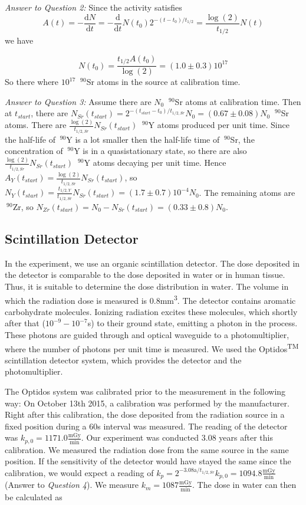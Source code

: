 \documentclass[a4paper,parskip]{scrartcl}
\begin{document}
\textit{Answer to Question 2:} Since the activity satisfies 
$$A(t) = -\frac{\mathrm{d}N}{\mathrm{d}t} = -\frac{\mathrm{d}}{\mathrm{d}t}N(t_0)2^{-(t-t_{0})/t_{1/2}} = \frac{\log(2)}{t_{1/2}}N(t)$$
we have

$$N(t_0) = \frac{t_{1/2}A(t_0)}{\log(2)} = (1.0 \pm 0.3)10^{17}$$
So there where $10^{17}$ $~^{90}$Sr atoms in the source at calibration time.

\textit{Answer to Question 3:} Assume there are $N_0$ $~^{90}$Sr atoms at calibration time. Then at $t_{start}$, there are $N_{Sr}(t_{start}) = 2^{-(t_{start}-t_{0})/t_{1/2,Sr}}N_0 = (0.67 \pm 0.08)N_0$ $~^{90}$Sr atoms. There are $\frac{\log(2)}{t_{1/2,Sr}}N_{Sr}(t_{start})$ $~^{90}$Y atoms produced per unit time. Since the half-life of $~^{90}$Y is a lot smaller then the half-life time of $~^{90}$Sr, the concentration of $~^{90}$Y is in a quasistationary state, so there are also $\frac{\log(2)}{t_{1/2,Sr}}N_{Sr}(t_{start})$ $~^{90}$Y atoms decaying per unit time. Hence $A_{Y}(t_{start}) = \frac{\log(2)}{t_{1/2,Sr}}N_{Sr}(t_{start})$, so $N_Y(t_{start})=\frac{t_{1/2,Y}}{t_{1/2,Sr}}N_{Sr}(t_{start}) = (1.7 \pm 0.7)10^{-4}N_0$. The remaining atoms are $~^{90}$Zr, so $N_{Zr}(t_{start})=N_0-N_{Sr}(t_{start})=(0.33 \pm 0.8)N_0$.

\subsection{Scintillation Detector}
In the experiment, we use an organic scintillation detector. The dose deposited in the detector is comparable to the dose deposited in water or in human tissue. Thus, it is suitable to determine the dose distribution in water. The volume in which the radiation dose is measured is 0.8mm\textsuperscript{3}. The detector contains aromatic carbohydrate molecules. Ionizing radiation excites these molecules, which shortly after that ($10^{-9}-10^{-7}$s) to their ground state, emitting a photon in the process. These photons are guided through and optical waveguide to a photomultiplier, where the number of photons per unit time is measured. We used the Optidos\textsuperscript{TM} scintillation detector system, which provides the detector and the photomultiplier.    

The Optidos system was calibrated prior to the measurement in the following way: On October 13th 2015, a calibration was performed by the manufacturer. Right after this calibration, the dose deposited from the radiation source in a fixed position during a 60s interval was measured. The reading of the detector was $k_{p,0}=1171.0\frac{\mathrm{mGy}}{\mathrm{min}}$. Our experiment was conducted $3.08$ years after this calibration. We measured the radiation dose from the same source in the same position. If the sensitivity of the detector would have stayed the same since the calibration, we would expect a reading of $k_p = 2^{-3.08\mathrm{a}/t_{1/2,Sr}}k_{p,0}=1094.8\frac{\mathrm{mGy}}{\mathrm{min}}$ (Answer to \textit{Question 4}). We measure $k_m = 1087\frac{\mathrm{mGy}}{\mathrm{min}}$. The dose in water can then be calculated as 
\end{document}
